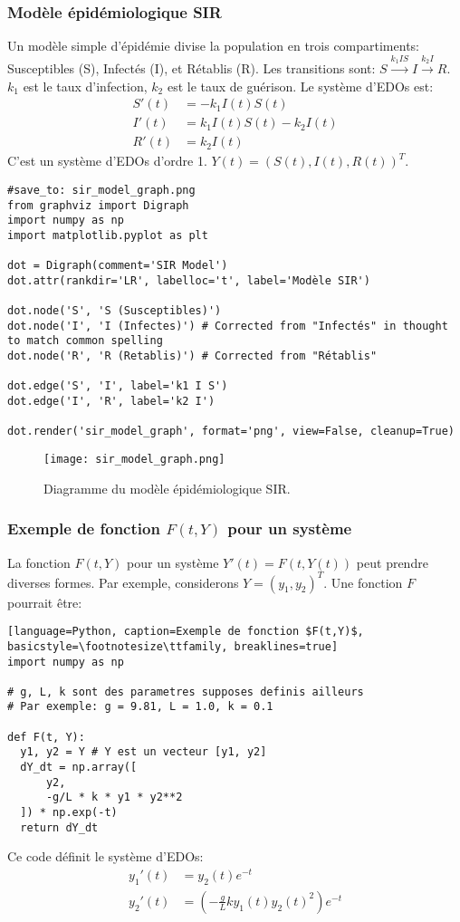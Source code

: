 \subsubsection{Modèle épidémiologique SIR}
\label{sssec:sir_model}
Un modèle simple d'épidémie divise la population en trois compartiments: Susceptibles (S), Infectés (I), et Rétablis (R).
Les transitions sont: $S \xrightarrow{k_1 I S} I \xrightarrow{k_2 I} R$.
$k_1$ est le taux d'infection, $k_2$ est le taux de guérison.
Le système d'EDOs est:
\begin{align*}
S'(t) &= -k_1 I(t) S(t) \\
I'(t) &= k_1 I(t) S(t) - k_2 I(t) \\
R'(t) &= k_2 I(t)
\end{align*}
C'est un système d'EDOs d'ordre 1. $Y(t) = (S(t), I(t), R(t))^T$.

\begin{verbatim}
#save_to: sir_model_graph.png
from graphviz import Digraph
import numpy as np 
import matplotlib.pyplot as plt

dot = Digraph(comment='SIR Model')
dot.attr(rankdir='LR', labelloc='t', label='Modèle SIR')

dot.node('S', 'S (Susceptibles)')
dot.node('I', 'I (Infectes)') # Corrected from "Infectés" in thought to match common spelling
dot.node('R', 'R (Retablis)') # Corrected from "Rétablis"

dot.edge('S', 'I', label='k1 I S')
dot.edge('I', 'R', label='k2 I')

dot.render('sir_model_graph', format='png', view=False, cleanup=True)
\end{verbatim}
\begin{figure}[h]
\centering
\texttt{[image: sir\_model\_graph.png]}
\caption{Diagramme du modèle épidémiologique SIR.}
\label{fig:sir_model_graph}
\end{figure}

\subsubsection{Exemple de fonction $F(t,Y)$ pour un système}
\label{sssec:exemple_F_t_Y}
La fonction $F(t,Y)$ pour un système $Y'(t) = F(t,Y(t))$ peut prendre diverses formes. Par exemple, considerons $Y=(y_1, y_2)^T$. Une fonction $F$ pourrait être:
\begin{lstlisting}[language=Python, caption=Exemple de fonction $F(t,Y)$, basicstyle=\footnotesize\ttfamily, breaklines=true]
import numpy as np

# g, L, k sont des parametres supposes definis ailleurs
# Par exemple: g = 9.81, L = 1.0, k = 0.1

def F(t, Y):
  y1, y2 = Y # Y est un vecteur [y1, y2]
  dY_dt = np.array([
      y2,
      -g/L * k * y1 * y2**2 
  ]) * np.exp(-t)
  return dY_dt
\end{lstlisting}
Ce code définit le système d'EDOs:
\begin{align*}
y_1'(t) &= y_2(t) e^{-t} \\
y_2'(t) &= \left(-\frac{g}{L} k y_1(t) y_2(t)^2\right) e^{-t}
\end{align*}

